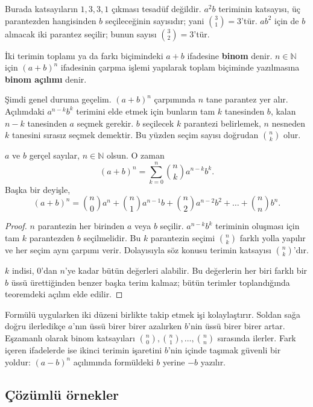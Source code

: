 Burada katsayıların $1,3,3,1$ çıkması tesadüf değildir. $a^2b$ teriminin katsayısı, üç parantezden hangisinden $b$ seçileceğinin sayısıdır; yani $\binom{3}{1}=3$'tür. $ab^2$ için de $b$ alınacak iki parantez seçilir; bunun sayısı $\binom{3}{2}=3$'tür.

\begin{definition}
İki terimin toplamı ya da farkı biçimindeki $a+b$ ifadesine \textbf{binom} denir. $n\in\mathbb{N}$ için $(a+b)^n$ ifadesinin çarpma işlemi yapılarak toplam biçiminde yazılmasına \textbf{binom açılımı} denir.
\end{definition}

Şimdi genel duruma geçelim. $(a+b)^n$ çarpımında $n$ tane parantez yer alır. Açılımdaki $a^{n-k}b^k$ terimini elde etmek için bunların tam $k$ tanesinden $b$, kalan $n-k$ tanesinden $a$ seçmek gerekir. $b$ seçilecek $k$ parantezi belirlemek, $n$ nesneden $k$ tanesini sırasız seçmek demektir. Bu yüzden seçim sayısı doğrudan $\binom{n}{k}$ olur.

\begin{theorem}
$a$ ve $b$ gerçel sayılar, $n\in\mathbb{N}$ olsun. O zaman
\[
(a+b)^n=\sum_{k=0}^{n}\binom{n}{k}a^{n-k}b^k.
\]
Başka bir deyişle,
\[
(a+b)^n=\binom{n}{0}a^n+\binom{n}{1}a^{n-1}b+\binom{n}{2}a^{n-2}b^2+\dots+\binom{n}{n}b^n.
\]
\end{theorem}

\begin{proof}
$n$ parantezin her birinden $a$ veya $b$ seçilir. $a^{n-k}b^k$ teriminin oluşması için tam $k$ parantezden $b$ seçilmelidir. Bu $k$ parantezin seçimi $\binom{n}{k}$ farklı yolla yapılır ve her seçim aynı çarpımı verir. Dolayısıyla söz konusu terimin katsayısı $\binom{n}{k}$'dır.

$k$ indisi, $0$'dan $n$'ye kadar bütün değerleri alabilir. Bu değerlerin her biri farklı bir $b$ üssü ürettiğinden benzer başka terim kalmaz; bütün terimler toplandığında teoremdeki açılım elde edilir.
\end{proof}

Formülü uygularken iki düzeni birlikte takip etmek işi kolaylaştırır. Soldan sağa doğru ilerledikçe $a$'nın üssü birer birer azalırken $b$'nin üssü birer birer artar. Eşzamanlı olarak binom katsayıları $\binom{n}{0},\binom{n}{1},\ldots,\binom{n}{n}$ sırasında ilerler. Fark içeren ifadelerde ise ikinci terimin işaretini $b$'nin içinde taşımak güvenli bir yoldur: $(a-b)^n$ açılımında formüldeki $b$ yerine $-b$ yazılır.

\subsection{Çözümlü örnekler}

